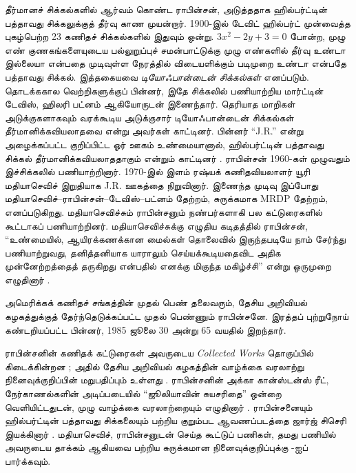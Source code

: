 \documentclass[../../../include/open-logic-section]{subfiles}
\begin{document}
தீர்மானச் சிக்கல்களில் ஆர்வம் கொண்ட ராபின்சன், அடுத்ததாக
ஹில்பர்ட்டின் பத்தாவது சிக்கலுக்குத் தீர்வு காண முயன்றார். 1900-இல்
டேவிட் ஹில்பர்ட் முன்வைத்த புகழ்பெற்ற 23 கணிதச் சிக்கல்களில் இதுவும்
ஒன்று. $3x^2 - 2y +3 = 0$ போன்ற, முழு எண் குணகங்களையுடைய பல்லுறுப்புச்
சமன்பாட்டுக்கு முழு எண்களில் தீர்வு உண்டா இல்லையா என்பதை முடிவுள்ள
நேரத்தில் விடையளிக்கும் படிமுறை உண்டா என்பதே பத்தாவது சிக்கல்.
இத்தகையவை \emph{டியோஃபான்டைன் சிக்கல்கள்} எனப்படும். தொடக்ககால
வெற்றிகளுக்குப் பின்னர், இதே சிக்கலில் பணியாற்றிய மார்ட்டின் டேவிஸ்,
ஹிலரி பட்னம் ஆகியோருடன் இணைந்தார். தெரியாத மாறிகள் அடுக்குகளாகவும்
வரக்கூடிய அடுக்குசார் டியோஃபான்டைன் சிக்கல்கள் தீர்மானிக்கவியலாதவை
என்று அவர்கள் காட்டினர். பின்னர் ``J.R.'' என்று அழைக்கப்பட்ட குறிப்பிட்ட
ஓர் ஊகம் உண்மையானால், ஹில்பர்ட்டின் பத்தாவது சிக்கல்
தீர்மானிக்கவியலாததாகும் என்றும் காட்டினர்
\citep{DavisPutnamRobinson1961}. ராபின்சன் 1960-கள் முழுவதும் இச்சிக்கலில்
பணியாற்றினார். 1970-இல் இளம் ரஷ்யக் கணிதவியலாளர் யூரி மதியாசெவிச்
இறுதியாக J.R. ஊகத்தை நிறுவினார். இணைந்த முடிவு இப்போது
மதியாசெவிச்--ராபின்சன்--டேவிஸ்--பட்னம் தேற்றம், சுருக்கமாக MRDP
தேற்றம், எனப்படுகிறது. மதியாசெவிச்சும் ராபின்சனும் நண்பர்களாகி பல
கட்டுரைகளில் கூட்டாகப் பணியாற்றினர். மதியாசெவிச்சுக்கு எழுதிய
கடிதத்தில் ராபின்சன், ``உண்மையில், ஆயிரக்கணக்கான மைல்கள் தொலைவில்
இருந்தபடியே நாம் சேர்ந்து பணியாற்றுவது, தனித்தனியாக யாராலும்
செய்யக்கூடியதைவிட அதிக முன்னேற்றத்தைத் தருகிறது என்பதில் எனக்கு
மிகுந்த மகிழ்ச்சி'' என்று ஒருமுறை எழுதினார் \citep[45]{Matijasevich1992}.

அமெரிக்கக் கணிதச் சங்கத்தின் முதல் பெண் தலைவரும், தேசிய அறிவியல்
கழகத்துக்குத் தேர்ந்தெடுக்கப்பட்ட முதல் பெண்ணும் ராபின்சனே. இரத்தப்
புற்றுநோய் கண்டறியப்பட்ட பின்னர், 1985 ஜூலை 30 அன்று 65 வயதில்
இறந்தார்.

\begin{reading}
ராபின்சனின் கணிதக் கட்டுரைகள் அவருடைய \textit{Collected
  Works} தொகுப்பில் கிடைக்கின்றன \citep{Robinson1996}; அதில்
தேசிய அறிவியல் கழகத்தின் வாழ்க்கை வரலாற்று நினைவுக்குறிப்பின்
மறுபதிப்பும் உள்ளது \citep{Feferman1994}. ராபின்சனின் அக்கா
கான்ஸ்டன்ஸ் ரீட், நேர்காணல்களின் அடிப்படையில் ``ஜூலியாவின்
சுயசரிதை'' ஒன்றை \citep{Reid1986} வெளியிட்டதுடன், முழு வாழ்க்கை
வரலாற்றையும் எழுதினார் \citep{Reid1996}. ராபின்சனையும்
ஹில்பர்ட்டின் பத்தாவது சிக்கலையும் பற்றிய குறும்பட ஆவணப்படத்தை
ஜார்ஜ் சிசெரி இயக்கினார் \citep{Csicsery2016}. மதியாசெவிச்,
ராபின்சனுடன் செய்த கூட்டுப் பணிகள், தமது பணியில் அவருடைய தாக்கம்
ஆகியவை பற்றிய சுருக்கமான நினைவுக்குறிப்புக்கு
\citep{Matijasevich1992}-ஐப் பார்க்கவும்.
\end{reading}
\end{document}
